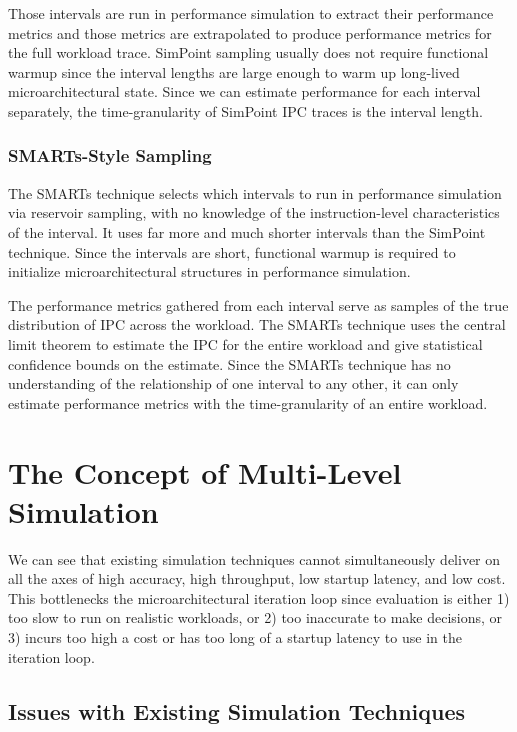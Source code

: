 \documentclass[sigplan,nonacm,10pt]{acmart}
\begin{document}
Those intervals are run in performance simulation to extract their performance metrics and those metrics are extrapolated to produce performance metrics for the full workload trace.
SimPoint sampling usually does not require functional warmup since the interval lengths are large enough to warm up long-lived microarchitectural state.
Since we can estimate performance for each interval separately, the time-granularity of SimPoint IPC traces is the interval length.

\subsubsection{SMARTs-Style Sampling}

The SMARTs technique selects which intervals to run in performance simulation via reservoir sampling, with no knowledge of the instruction-level characteristics of the interval.
It uses far more and much shorter intervals than the SimPoint technique.
Since the intervals are short, functional warmup is required to initialize microarchitectural structures in performance simulation.

The performance metrics gathered from each interval serve as samples of the true distribution of IPC across the workload.
The SMARTs technique uses the central limit theorem to estimate the IPC for the entire workload and give statistical confidence bounds on the estimate.
Since the SMARTs technique has no understanding of the relationship of one interval to any other, it can only estimate performance metrics with the time-granularity of an entire workload.

\section{The Concept of Multi-Level Simulation}


We can see that existing simulation techniques cannot simultaneously deliver on all the axes of high accuracy, high throughput, low startup latency, and low cost.
This bottlenecks the microarchitectural iteration loop since evaluation is either 1) too slow to run on realistic workloads, or 2) too inaccurate to make decisions, or 3) incurs too high a cost or has too long of a startup latency to use in the iteration loop.

\subsection{Issues with Existing Simulation Techniques}
\end{document}
